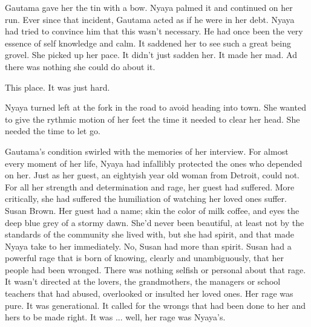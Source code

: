 \documentclass{amsart}
\begin{document}
Gautama gave her the tin with a bow. Nyaya palmed it and continued on her run. Ever since that incident, Gautama acted as if he were in her debt. Nyaya had tried to convince him that this wasn't necessary. He had once been the very essence of self knowledge and calm. It saddened her to see such a great being grovel. She picked up her pace. It didn't just sadden her. It made her mad. Ad there was nothing she could do about it. 

This place. It was just hard.

Nyaya turned left at the fork in the road to avoid heading into town. She wanted to give the rythmic motion of her feet the time it needed to clear her head. She needed the time to let go.

Gautama's condition swirled with the memories of her interview. For almost every moment of her life, Nyaya had infallibly protected the ones who depended on her. Just as her guest, an eightyish year old woman from Detroit, could not. For all her strength and determination and rage, her guest had suffered. More critically, she had suffered the humiliation of watching her loved ones suffer. Susan Brown. Her guest had a name; skin the color of milk coffee, and eyes the deep blue grey of a stormy dawn. She'd never been beautiful, at least not by the standards of the community she lived with, but she had spirit, and that made Nyaya take to her immediately. No, Susan had more than spirit. Susan had a powerful rage that is born of knowing, clearly and unambiguously, that her people had been wronged. There was nothing selfish or personal about that rage. It wasn't directed at the lovers, the grandmothers, the managers or school teachers that had abused, overlooked or insulted her loved ones. Her rage was pure. It was generational. It called for the wrongs that had been done to her and hers to be made right. It was ... well, her rage was Nyaya's.
\end{document}
